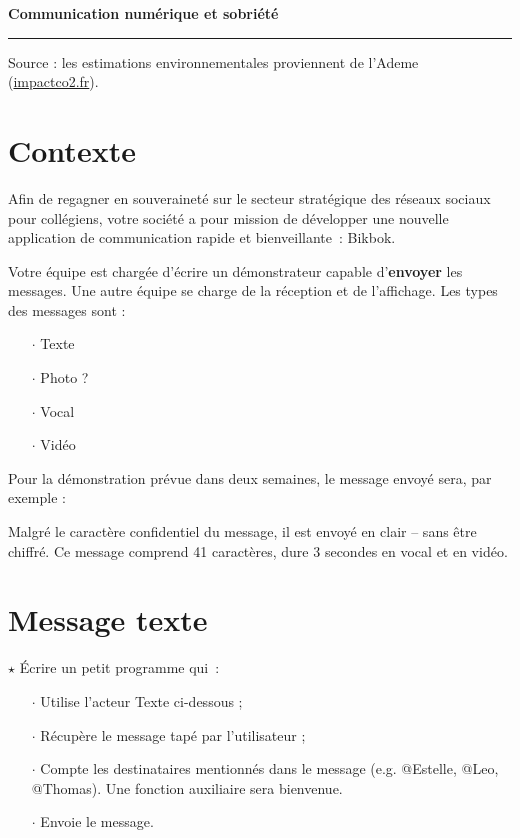 \documentclass[a4paper]{article}
\begin{document}
\begin{center}
  \Large\bf Communication numérique et sobriété
\end{center}

\noindent\rule{\linewidth}{.6pt}

\bigskip

Source : les estimations environnementales proviennent de l'Ademe (\url{impactco2.fr}).

\section*{Contexte}

Afin de regagner en souveraineté sur le secteur stratégique des réseaux sociaux pour collégiens, votre société a pour mission de développer une nouvelle application de communication rapide et bienveillante~: Bikbok.

Votre équipe est chargée d'écrire un démonstrateur capable d'\textbf{envoyer} les messages. Une autre équipe se charge de la réception et de l'affichage. Les types des messages sont :

\begin{itemize}[itemsep=0.2ex]
\item[$\cdot$] Texte
\item[$\cdot$] Photo ?
\item[$\cdot$] Vocal
\item[$\cdot$] Vidéo
\end{itemize}

Pour la démonstration prévue dans deux semaines, le message envoyé sera, par exemple :

\smallskip
\centerline{}
\smallskip

Malgré le caractère confidentiel du message, il est envoyé en clair -- sans être chiffré. Ce message comprend 41 caractères, dure 3 secondes en vocal et en vidéo.

\section{Message texte}

$\star$ Écrire un petit programme qui~:

\begin{itemize}[itemsep=0.2ex]
\item[$\cdot$] Utilise l'acteur Texte ci-dessous ;
\item[$\cdot$] Récupère le message tapé par l'utilisateur ;
\item[$\cdot$] Compte les destinataires mentionnés dans le message (e.g. @Estelle, @Leo, @Thomas). Une fonction auxiliaire sera bienvenue.
\item[$\cdot$] Envoie le message.
\end{itemize}
\end{document}
